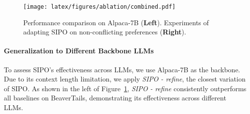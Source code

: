 \begin{table}[t]
 \setlength{\abovecaptionskip}{0.05cm}
 \setlength{\belowcaptionskip}{0cm}
\setlength{\tabcolsep}{2pt}
\renewcommand*{\arraystretch}{0.9}
\centering
{}
\caption{Average response reward comparison between SIPO and the original responses. Bold font and underline indicate the best and second-best results. RI denotes the relative improvement to the second-best results.}
\label{tab:pareto_optimality}
\end{table}


\begin{figure}[t]
 \setlength{\abovecaptionskip}{0.05cm}
 \setlength{\belowcaptionskip}{0cm}
    \centering
    \texttt{[image: latex/figures/ablation/combined.pdf]}
    \caption{Performance comparison on Alpaca-7B (\textbf{Left}). Experiments of adapting SIPO on non-conflicting preferences (\textbf{Right}). }
    \label{figure:combined}
\end{figure}


\paragraph{Generalization to Different Backbone LLMs}
To assess SIPO’s effectiveness across LLMs, we use Alpaca-7B as the backbone. Due to its context length limitation, we apply \emph{SIPO - refine}, the closest variation of SIPO. As shown in the left of Figure~\ref{figure:combined}, \emph{SIPO - refine} consistently outperforms all baselines on BeaverTails, demonstrating its effectiveness across different LLMs.



